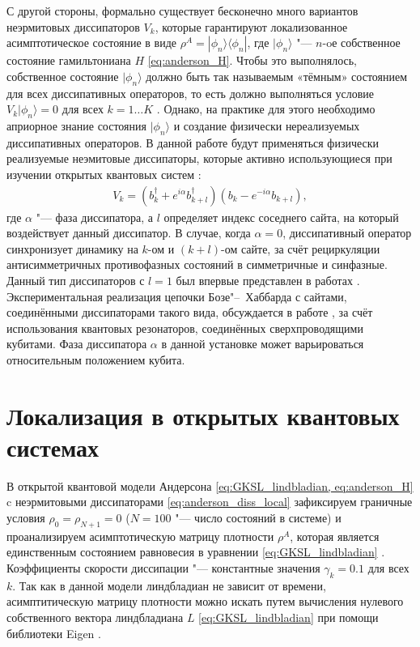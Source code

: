 С другой стороны, формально существует бесконечно много вариантов неэрмитовых диссипаторов \(V_k\), которые гарантируют локализованное асимптотическое состояние в виде \(\rho^A = | \phi_n \rangle \langle \phi_n |\), где \(| \phi_n \rangle\) "--- \(n\)-oе собственное состояние гамильтониана \(H\) \cref{eq:anderson_H}. 
Чтобы это выполнялось, собственное состояние \(| \phi_n \rangle\) должно быть так называемым «тёмным» состоянием для всех диссипативных операторов, то есть должно выполняться условие \(V_k | \phi_n \rangle = 0\) для всех \(k=1 \ldots K\) \cite{Diehl2008, Kraus2008}. 
Однако, на практике для этого необходимо априорное знание состояния \(| \phi_n \rangle\) и создание физически нереализуемых диссипативных операторов.
В данной работе будут применяться физически реализуемые неэмитовые диссипаторы, которые активно использующиеся при изучении открытых квантовых систем \cite{Diehl2008, Kraus2008, Bardyn2013, Barreiro2010, Kienzler2014, Vorberg2013}:
\begin{equation}
\label{eq:anderson_diss_local}
\begin{gathered}
V_k = \left( b^\dagger_k + e^{i \alpha} b^\dagger_{k+l}\right) \left( b_k - e^{-i \alpha} b_{k+l} \right),
\end{gathered}
\end{equation}
где \(\alpha\) "--- фаза диссипатора, а \(l\) определяет индекс соседнего сайта, на который воздействует данный диссипатор. 
В случае, когда \(\alpha = 0\), диссипативный оператор синхронизует динамику на \(k\)-ом и \((k+l)\)-ом сайте, за счёт рециркуляции антисимметричных противофазных состояний в симметричные и синфазные. 
Данный тип диссипаторов с \(l=1\) был впервые представлен в работах \cite{Diehl2008, Kraus2008}.
Экспериментальная реализация цепочки Бозе"--~Хаббарда с сайтами, соединёнными диссипаторами такого вида, обсуждается в работе \cite{Marcos2012}, за счёт использования квантовых резонаторов, соединённых сверхпроводящими кубитами.
Фаза диссипатора \(\alpha\) в данной установке может варьироваться относительным положением кубита.

\section{Локализация в открытых квантовых системах}\label{sec:ch1/sec4}

В открытой квантовой модели Андерсона \cref{eq:GKSL_lindbladian, eq:anderson_H} c неэрмитовыми диссипаторами \cref{eq:anderson_diss_local} зафиксируем граничные условия \(\rho_0 = \rho_{N+1} = 0\) (\(N = 100\) "--- число состояний в системе) и проанализируем асимптотическую матрицу плотности \(\rho^A\), которая является единственным состоянием равновесия в уравнении \cref{eq:GKSL_lindbladian} \cite{book2007, Albert2014}. Коэффициенты скорости диссипации "--- константные значения \(\gamma_k = 0.1\) для всех \(k\).
Так как в данной модели линдбладиан не зависит от времени, асимптитическую матрицу плотности можно искать путем вычисления нулевого собственного вектора линдбладиана \(L\) \cref{eq:GKSL_lindbladian} при помощи библиотеки Eigen \cite{eigenweb}.

